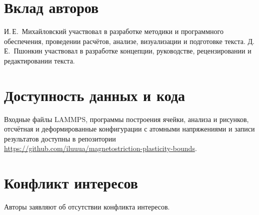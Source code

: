\documentclass[11pt,a4paper]{article}
\begin{document}
\section*{Вклад авторов}

И.\,Е.~Михайловский участвовал в разработке методики
и программного обеспечения, проведении расчётов, анализе, визуализации
и подготовке текста. Д.\,Е.~Пшонкин участвовал в разработке концепции,
руководстве, рецензировании и редактировании текста.

\section*{Доступность данных и кода}

Входные файлы LAMMPS, программы построения ячейки, анализа и рисунков,
отсчётная и деформированные конфигурации с атомными напряжениями
и записи результатов доступны в репозитории
\url{https://github.com/iluuua/magnetostriction-plasticity-bounds}.

\section*{Конфликт интересов}

Авторы заявляют об отсутствии конфликта интересов.



\end{document}
